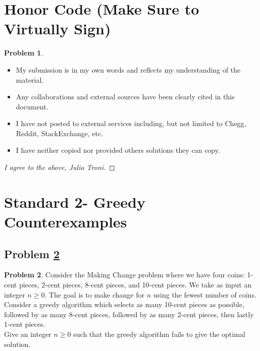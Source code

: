 \documentclass[11pt]{article}
\theoremstyle{definition}
\theoremstyle{definition}
\newtheorem{required}{Problem}
\theoremstyle{definition}
\begin{document}
\section{Honor Code (Make Sure to Virtually Sign)} \label{HonorCode}

\begin{required}
\begin{itemize}
\item My submission is in my own words and reflects my understanding of the material.
\item Any collaborations and external sources have been clearly cited in this document.
\item I have not posted to external services including, but not limited to Chegg, Reddit, StackExchange, etc.
\item I have neither copied nor provided others solutions they can copy.
\end{itemize}

\end{required}

\begin{proof}[I agree to the above, Julia Troni]
\end{proof}


\newpage
\section{Standard 2- Greedy Counterexamples}

\subsection{Problem \ref{prob}}
\begin{required} \label{prob}
Consider the Making Change problem where we have four coins: 1-cent pieces, 2-cent pieces, 8-cent pieces, and 10-cent pieces. We take as input an integer $n \geq 0$. The goal is to make change for $n$ using the fewest number of coins. Consider a greedy algorithm which selects as many 10-cent pieces as possible, followed by as many 8-cent pieces, followed by as many 2-cent pieces, then lastly 1-cent pieces. \\

\noindent Give an integer $n \geq 0$ such that the greedy algorithm fails to give the optimal solution.\end{required}
\end{document}
